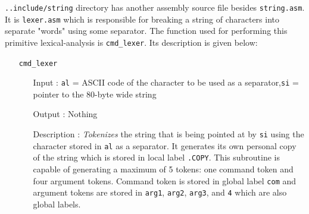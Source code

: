 \texttt{..include/string} directory has another assembly source file besides \texttt{string.asm}. It is \texttt{lexer.asm} which is responsible for breaking a string of characters into separate "words" using some separator. The function used for performing this primitive lexical-analysis is \texttt{cmd\_lexer}. Its description is given below:
\begin{enumerate}
  \item[] \texttt{cmd\_lexer}
  		\begin{enumerate}[align=parleft, labelsep=2cm, leftmargin=1.06in]
  		  \item[Input]: \texttt{al} = ASCII code of the character to be used as a separator,\newline\texttt{si} = pointer to the 80-byte wide string
  		  \item[Output]: Nothing
  		  \item[Description]: \textit{Tokenizes} the string that is being pointed at by \texttt{si} using the character stored in \texttt{al} as a separator. It generates its own personal copy of the string which is stored in local label \texttt{.COPY}. This subroutine is capable of generating a maximum of 5 tokens: one command token and four argument tokens. Command token is stored in global label \texttt{com} and argument tokens are stored in \texttt{arg1}, \texttt{arg2}, \texttt{arg3}, and \texttt{4} which are also global labels.
  		\end{enumerate}
\end{enumerate} 
